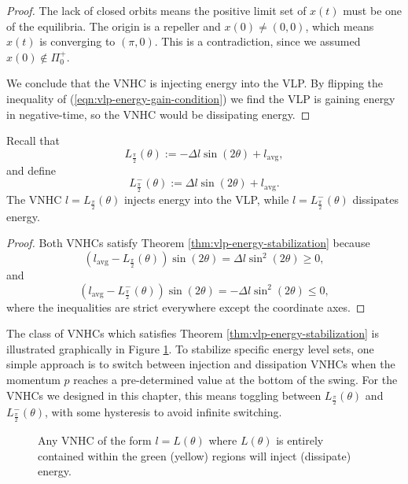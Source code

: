 \begin{proof}
   The lack of closed orbits means the positive limit set of \(x(t)\) must 
   be one of the equilibria. 
   The origin is a repeller and \(x(0) \neq (0,0)\), which means \(x(t)\) is
   converging to \((\pi,0)\).
   This is a contradiction, since we assumed \(x(0) \not \in \Pi_0^+\).

   We conclude that the VNHC is injecting energy into the VLP.
   By flipping the inequality of (\ref{eqn:vlp-energy-gain-condition})
   we find the VLP is gaining energy in negative-time, so the VNHC would be
   dissipating energy.
\end{proof}

\begin{cor}
   Recall that
   \[
      L_\frac{\pi}{2}(\theta) := -\Delta l \sin(2\theta) + l_\text{avg}
      ,
   \]
   and define 
   \[
      L^{-}_\frac{\pi}{2}(\theta) := \Delta l \sin(2\theta) + l_\text{avg}
      .
   \]
   The VNHC \(l = L_\frac{\pi}{2}(\theta)\) injects energy into the VLP,
   while \(l = L^{-}_\frac{\pi}{2}(\theta)\) dissipates energy.
\end{cor}
\begin{proof}
   Both VNHCs satisfy Theorem \ref{thm:vlp-energy-stabilization} because
   \[
      \left(l_\text{avg} - L_\frac{\pi}{2}(\theta)\right)\sin(2\theta) = 
      \Delta l \sin^2(2\theta) \geq 0
      ,
   \] 
   and
   \[
      \left(l_\text{avg} - L^{-}_\frac{\pi}{2}(\theta)\right)\sin(2\theta) = 
      - \Delta l \sin^2(2\theta) \leq 0
      ,
   \] 
   where the inequalities are strict everywhere except the coordinate axes.
\end{proof}


The class of VNHCs which satisfies Theorem \ref{thm:vlp-energy-stabilization} is
illustrated graphically in Figure \ref{fig:vlp-energy-in-out}. 
To stabilize specific energy level sets, one simple approach is to switch
between injection and dissipation VNHCs when the momentum \(p\) reaches
a pre-determined value at the bottom of the swing.
For the VNHCs we designed in this chapter, this means toggling
between \(L_\frac{\pi}{2}(\theta)\) and \(L^{-}_\frac{\pi}{2}(\theta)\),
with some hysteresis to avoid infinite switching.  

\begin{figure}
   \centering
   
   \caption{Any VNHC of the form \(l = L(\theta)\) where \(L(\theta)\)
      is entirely contained within
      the green (yellow) regions will inject (dissipate) energy.}
      \label{fig:vlp-energy-in-out}
\end{figure}

